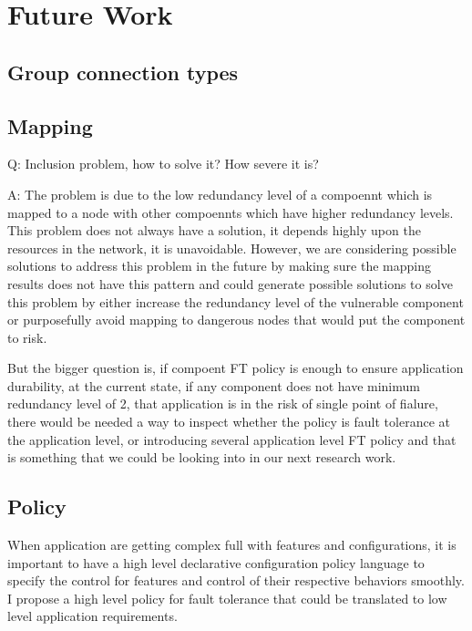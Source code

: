 \chapter{Future Work}
\label{c:future}


\section{Group connection types}

\section{Mapping}

Q: Inclusion problem, how to solve it? How severe it is?

A: The problem is due to the low redundancy level of a compoennt which is
mapped to a node with other compoennts which have higher redundancy levels.
This problem does not always have a solution, it depends highly upon the
resources in the network, it is unavoidable. However, we are considering
possible solutions to address this problem in the future by making sure the
mapping results does not have this pattern and could generate possible
solutions to solve this problem by either increase the redundancy level of the
vulnerable component or purposefully avoid mapping to dangerous nodes that
would put the component to risk.

But the bigger question is, if compoent FT policy is enough to ensure
application durability, at the current state, if any component does not have
minimum redundancy level of 2, that application is in the risk of single point
of fialure, there would be needed a way to inspect whether the policy is fault
tolerance at the application level, or introducing several application level FT
policy and that is something that we could be looking into in our next
research work.

\section{Policy}


When application are getting complex full with features and configurations, 
it is important to have a high level declarative configuration policy language 
to specify the control for features and control of their respective behaviors 
smoothly. I propose a high level policy for fault tolerance that could be
translated to low level application requirements.
